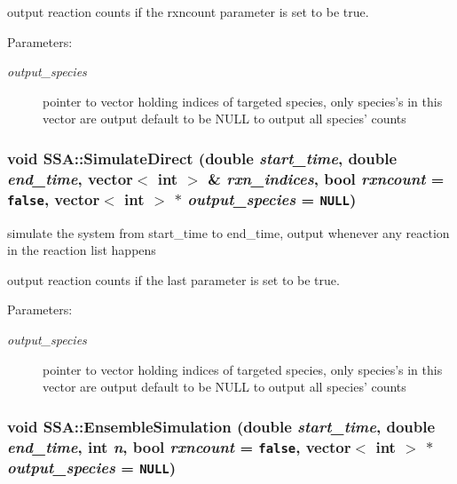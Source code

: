 output reaction counts if the rxncount parameter is set to be true. \begin{Desc}
\item[Parameters:]
\begin{description}
\item[{\em output\_\-species}]pointer to vector holding indices of targeted species, only species's in this vector are output default to be NULL to output all species' counts \end{description}
\end{Desc}
\hypertarget{class_s_s_a_39b771ef9ae9962352340c60a7fb7a0d}{
\subsubsection{\setlength{\rightskip}{0pt plus 5cm}void SSA::SimulateDirect (double {\em start\_\-time}, \/  double {\em end\_\-time}, \/  vector$<$ int $>$ \& {\em rxn\_\-indices}, \/  bool {\em rxncount} = {\tt false}, \/  vector$<$ int $>$ $\ast$ {\em output\_\-species} = {\tt NULL})}}
\label{class_s_s_a_39b771ef9ae9962352340c60a7fb7a0d}


simulate the system from start\_\-time to end\_\-time, output whenever any reaction in the reaction list happens 

output reaction counts if the last parameter is set to be true. \begin{Desc}
\item[Parameters:]
\begin{description}
\item[{\em output\_\-species}]pointer to vector holding indices of targeted species, only species's in this vector are output default to be NULL to output all species' counts \end{description}
\end{Desc}
\hypertarget{class_s_s_a_2a56bcd814994728e2e559735a84ed58}{
\subsubsection{\setlength{\rightskip}{0pt plus 5cm}void SSA::EnsembleSimulation (double {\em start\_\-time}, \/  double {\em end\_\-time}, \/  int {\em n}, \/  bool {\em rxncount} = {\tt false}, \/  vector$<$ int $>$ $\ast$ {\em output\_\-species} = {\tt NULL})}}
\label{class_s_s_a_2a56bcd814994728e2e559735a84ed58}


